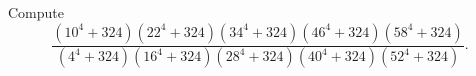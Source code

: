 Compute
\[\dfrac{(10^4+324)(22^4+324)(34^4+324)(46^4+324)(58^4+324)}{(4^4+324)(16^4+324)(28^4+324)(40^4+324)(52^4+324)}.\]
